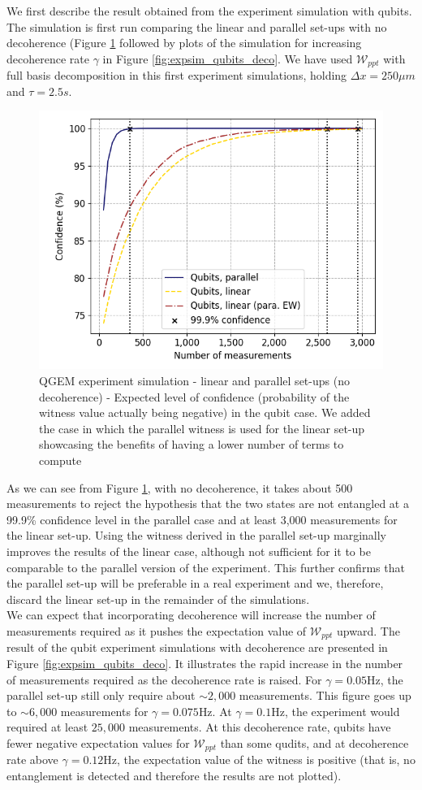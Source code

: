 \documentclass[%
 12pt,
 superscriptaddress,
 amsmath,
 amssymb,
 onecolumn,
 longbibliography
]{revtex4-2}
\begin{document}
\indent We first describe the result obtained from the experiment simulation with qubits. The simulation is first run comparing the linear and parallel set-ups with no decoherence (Figure \ref{fig:expsimqubits} followed by plots of the simulation for increasing decoherence rate $\gamma$  in Figure \ref{fig:expsim_qubits_deco}. We have used $\mathcal{W}_{ppt}$ with full basis decomposition in this first experiment simulations, holding $\Delta x = 250 \mu m$ and $\tau = 2.5s$.\\
	\begin{figure}
		\includegraphics[width=.5\columnwidth]{EW_confidence_v18.png}\par\medskip
	    \caption{QGEM experiment simulation - linear and parallel set-ups (no decoherence) - Expected level of confidence (probability of the witness value actually being negative) in the qubit case. We added the case in which the parallel witness is used for the linear set-up showcasing the benefits of having a lower number of terms to compute}\label{fig:expsimqubits}
	\end{figure}
\indent As we can see from Figure \ref{fig:expsimqubits}, with no decoherence, it takes about 500 measurements to reject the hypothesis that the two states are not entangled at a 99.9\% confidence level in the parallel case and at least 3,000 measurements for the linear set-up.  Using the witness derived in the parallel set-up marginally improves the results of the linear case, although not sufficient for it to be comparable to the parallel version of the experiment. This further confirms that the parallel set-up will be preferable in a real experiment and we, therefore, discard the linear set-up in the remainder of the simulations. \\
\indent We can expect that incorporating decoherence will increase the number of measurements required as it pushes the expectation value of $\mathcal{W}_{ppt}$ upward. The result of the qubit experiment simulations with decoherence are presented in Figure \ref{fig:expsim_qubits_deco}. It illustrates the rapid increase in the number of measurements required as the decoherence rate is raised. For $\gamma=0.05$Hz, the parallel set-up still only require about $\sim 2,000$ measurements. This figure goes up to $\sim 6,000$ measurements for $\gamma = 0.075$Hz. At $\gamma=0.1$Hz, the experiment would required at least $25,000$ measurements. At this decoherence rate, qubits have fewer negative expectation values for $\mathcal{W}_{ppt}$ than some qudits, and at decoherence rate above $\gamma = 0.12$Hz, the expectation value of the witness is positive (that is, no entanglement is detected and therefore the results are not plotted). \\
\end{document}
